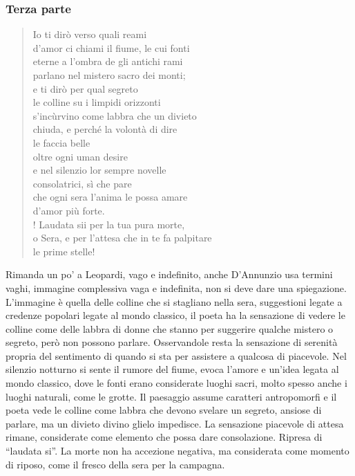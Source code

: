 \documentclass{book}
\newcounter{mar}
\begin{document}
\subsubsection{Terza parte}

\begin{verse}
Io ti dirò verso quali reami\\
d’amor ci chiami il fiume, le cui fonti\\
eterne a l’ombra de gli antichi rami\\
parlano nel mistero sacro dei monti;\\
e ti dirò per qual segreto\\
le colline su i limpidi orizzonti\\
s’incùrvino come labbra che un divieto\\
chiuda, e perché la volontà di dire\\
le faccia belle\\
oltre ogni uman desire\\
e nel silenzio lor sempre novelle\\
consolatrici, sì che pare\\
che ogni sera l’anima le possa amare\\
d’amor più forte.\\!
Laudata sii per la tua pura morte,\\
o Sera, e per l’attesa che in te fa palpitare\\
le prime stelle!
\end{verse}

Rimanda un po' a Leopardi, vago e indefinito, anche D'Annunzio usa
termini vaghi, immagine complessiva vaga e indefinita, non si deve dare
una spiegazione. L'immagine è quella delle colline che si stagliano
nella sera, suggestioni legate a credenze popolari legate al mondo
classico, il poeta ha la sensazione di vedere le colline come delle
labbra di donne che stanno per suggerire qualche mistero o segreto, però
non possono parlare. Osservandole resta la sensazione di serenità
propria del sentimento di quando si sta per assistere a qualcosa di
piacevole. Nel silenzio notturno si sente il rumore del fiume, evoca
l'amore e un'idea legata al mondo classico, dove le fonti erano
considerate luoghi sacri, molto spesso anche i luoghi naturali, come le
grotte. Il paesaggio assume caratteri antropomorfi e il poeta vede le
colline come labbra che devono svelare un segreto, ansiose di parlare,
ma un divieto divino glielo impedisce. La sensazione piacevole di attesa
rimane, considerate come elemento che possa dare consolazione. Ripresa
di ``laudata si''. La morte non ha accezione negativa, ma considerata
come momento di riposo, come il fresco della sera per la campagna.
\end{document}
